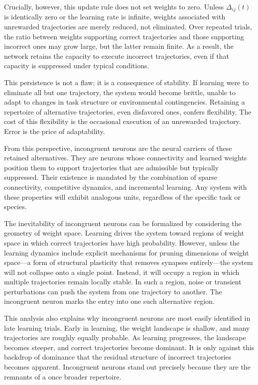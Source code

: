 \documentclass[11pt]{article}
\begin{document}
Crucially, however, this update rule does not set weights to zero. Unless $\Delta_{ij}(t)$ is identically zero or the learning rate is infinite, weights associated with unrewarded trajectories are merely reduced, not eliminated. Over repeated trials, the ratio between weights supporting correct trajectories and those supporting incorrect ones may grow large, but the latter remain finite. As a result, the network retains the capacity to execute incorrect trajectories, even if that capacity is suppressed under typical conditions.

This persistence is not a flaw; it is a consequence of stability. If learning were to eliminate all but one trajectory, the system would become brittle, unable to adapt to changes in task structure or environmental contingencies. Retaining a repertoire of alternative trajectories, even disfavored ones, confers flexibility. The cost of this flexibility is the occasional execution of an unrewarded trajectory. Error is the price of adaptability.

From this perspective, incongruent neurons are the neural carriers of these retained alternatives. They are neurons whose connectivity and learned weights position them to support trajectories that are admissible but typically suppressed. Their existence is mandated by the combination of sparse connectivity, competitive dynamics, and incremental learning. Any system with these properties will exhibit analogous units, regardless of the specific task or species.

The inevitability of incongruent neurons can be formalized by considering the geometry of weight space. Learning drives the system toward regions of weight space in which correct trajectories have high probability. However, unless the learning dynamics include explicit mechanisms for pruning dimensions of weight space—a form of structural plasticity that removes synapses entirely—the system will not collapse onto a single point. Instead, it will occupy a region in which multiple trajectories remain locally stable. In such a region, noise or transient perturbations can push the system from one trajectory to another. The incongruent neuron marks the entry into one such alternative region.

This analysis also explains why incongruent neurons are most easily identified in late learning trials. Early in learning, the weight landscape is shallow, and many trajectories are roughly equally probable. As learning progresses, the landscape becomes steeper, and correct trajectories become dominant. It is only against this backdrop of dominance that the residual structure of incorrect trajectories becomes apparent. Incongruent neurons stand out precisely because they are the remnants of a once broader repertoire.
\end{document}
